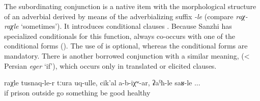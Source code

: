 The subordinating conjunction   is a native item with the morphological structure of an adverbial derived by means of the adverbializing suffix \textit{-le} (compare \textit{raχ-raχle} `sometimes'). It introduces conditional clauses . Because Sanzhi has specialized conditionals for this function,  always co-occurs with one of the conditional forms (). The use of  is optional, whereas the conditional forms are mandatory. There is another borrowed conjunction with a similar meaning,  (< Persian \textit{eger} `if'), which occurs only in translated or elicited clauses.
%
\begin{exe}
	\ex	\label{ex:‎If I leave prison well, healthy, if nothing happens to me minor}
	\gll	raχle	tusnaq-le-r	tːura	uq-ulle,	cik'al	a-b-iχʷ-ar,	ʡaˁħ-le	saʁ-le ...\\
		if	prison	outside	go	something	be	good\tsc{-advz}	healthy\\
	\glt	{}
\end{exe}

